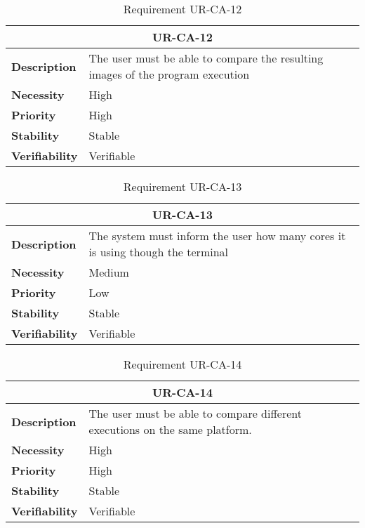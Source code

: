 \begin{table}[H]
    \centering
    \begin{tabular}{l p{10cm}}
        \toprule
        \multicolumn{2}{c}{UR-CA-12} \\
        \toprule
        \textbf{Description}        & The user must be able to compare the resulting images of the program execution \\
        \textbf{Necessity}          & High   \\
        \textbf{Priority}           & High   \\
        \textbf{Stability}          & Stable \\
        \textbf{Verifiability}      & Verifiable \\
    \end{tabular}
    \caption{Requirement UR-CA-12}
    \label{tab:ur-ca-12}
\end{table}

\begin{table}[H]
    \centering
    \begin{tabular}{l p{10cm}}
        \toprule
        \multicolumn{2}{c}{UR-CA-13} \\
        \toprule
        \textbf{Description}        & The system must inform the user how many cores it is using though the terminal \\
        \textbf{Necessity}          & Medium   \\
        \textbf{Priority}           & Low   \\
        \textbf{Stability}          & Stable \\
        \textbf{Verifiability}      & Verifiable \\
    \end{tabular}
    \caption{Requirement UR-CA-13}
    \label{tab:ur-ca-13}
\end{table}

\begin{table}[H]
    \centering
    \begin{tabular}{l p{10cm}}
        \toprule
        \multicolumn{2}{c}{UR-CA-14} \\
        \toprule
        \textbf{Description}        & The user must be able to compare different executions on the same platform. \\
        \textbf{Necessity}          & High   \\
        \textbf{Priority}           & High   \\
        \textbf{Stability}          & Stable \\
        \textbf{Verifiability}      & Verifiable \\
    \end{tabular}
    \caption{Requirement UR-CA-14}
    \label{tab:ur-ca-14}
\end{table}

